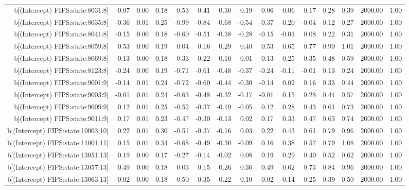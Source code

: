 \begin{table}[ht]
\begin{tabular}{rrrrrrrrrrrrrrr}
  b[(Intercept) FIPS:state:8031:8] & -0.07 & 0.00 & 0.18 & -0.53 & -0.41 & -0.30 & -0.19 & -0.06 & 0.06 & 0.17 & 0.28 & 0.39 & 2000.00 & 1.00 \\ 
  b[(Intercept) FIPS:state:8035:8] & -0.36 & 0.01 & 0.25 & -0.99 & -0.84 & -0.68 & -0.54 & -0.37 & -0.20 & -0.04 & 0.12 & 0.27 & 2000.00 & 1.00 \\ 
  b[(Intercept) FIPS:state:8041:8] & -0.15 & 0.00 & 0.18 & -0.60 & -0.51 & -0.38 & -0.28 & -0.15 & -0.03 & 0.08 & 0.22 & 0.31 & 2000.00 & 1.00 \\ 
  b[(Intercept) FIPS:state:8059:8] & 0.53 & 0.00 & 0.19 & 0.04 & 0.16 & 0.29 & 0.40 & 0.53 & 0.65 & 0.77 & 0.90 & 1.01 & 2000.00 & 1.00 \\ 
  b[(Intercept) FIPS:state:8069:8] & 0.13 & 0.00 & 0.18 & -0.33 & -0.22 & -0.10 & 0.01 & 0.13 & 0.25 & 0.35 & 0.48 & 0.59 & 2000.00 & 1.00 \\ 
  b[(Intercept) FIPS:state:8123:8] & -0.24 & 0.00 & 0.19 & -0.71 & -0.61 & -0.48 & -0.37 & -0.24 & -0.11 & -0.01 & 0.13 & 0.24 & 2000.00 & 1.00 \\ 
  b[(Intercept) FIPS:state:9001:9] & -0.14 & 0.01 & 0.24 & -0.72 & -0.60 & -0.44 & -0.30 & -0.14 & 0.02 & 0.16 & 0.33 & 0.44 & 2000.00 & 1.00 \\ 
  b[(Intercept) FIPS:state:9003:9] & -0.01 & 0.01 & 0.24 & -0.63 & -0.48 & -0.32 & -0.17 & -0.01 & 0.15 & 0.28 & 0.44 & 0.57 & 2000.00 & 1.00 \\ 
  b[(Intercept) FIPS:state:9009:9] & 0.12 & 0.01 & 0.25 & -0.52 & -0.37 & -0.19 & -0.05 & 0.12 & 0.28 & 0.43 & 0.61 & 0.73 & 2000.00 & 1.00 \\ 
  b[(Intercept) FIPS:state:9011:9] & 0.17 & 0.01 & 0.23 & -0.47 & -0.30 & -0.13 & 0.02 & 0.17 & 0.33 & 0.47 & 0.63 & 0.74 & 2000.00 & 1.00 \\ 
  b[(Intercept) FIPS:state:10003:10] & 0.22 & 0.01 & 0.30 & -0.51 & -0.37 & -0.16 & 0.03 & 0.22 & 0.43 & 0.61 & 0.79 & 0.96 & 2000.00 & 1.00 \\ 
  b[(Intercept) FIPS:state:11001:11] & 0.15 & 0.01 & 0.34 & -0.68 & -0.49 & -0.30 & -0.09 & 0.16 & 0.38 & 0.57 & 0.79 & 1.08 & 2000.00 & 1.00 \\ 
  b[(Intercept) FIPS:state:13051:13] & 0.19 & 0.00 & 0.17 & -0.27 & -0.14 & -0.02 & 0.08 & 0.19 & 0.29 & 0.40 & 0.52 & 0.62 & 2000.00 & 1.00 \\ 
  b[(Intercept) FIPS:state:13057:13] & 0.49 & 0.00 & 0.18 & 0.03 & 0.15 & 0.26 & 0.36 & 0.49 & 0.62 & 0.73 & 0.84 & 0.96 & 2000.00 & 1.00 \\ 
  b[(Intercept) FIPS:state:13063:13] & 0.02 & 0.00 & 0.18 & -0.50 & -0.35 & -0.22 & -0.10 & 0.02 & 0.14 & 0.25 & 0.39 & 0.50 & 2000.00 & 1.00 \\ 

\end{tabular}
\end{table}
